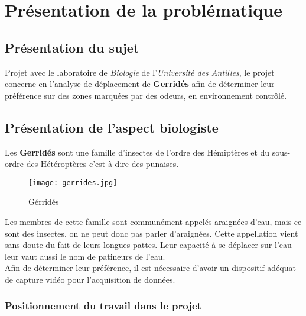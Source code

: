 \chapter{Présentation de la problématique}
    \section{Présentation du sujet}
    Projet avec le laboratoire de \textit{Biologie} de l'\textit{Université des Antilles}, le projet concerne en l'analyse de déplacement de \textbf{Gerridés} afin de déterminer leur préférence sur des zones marquées par des odeurs, en environnement contrôlé.


    \section{Présentation de l'aspect biologiste}
    Les \textbf{Gerridés} sont une famille d'insectes de l'ordre des Hémiptères et du sous-ordre des Hétéroptères c'est-à-dire des punaises.
    \begin{figure}[ht]
        \centering
        \texttt{[image: gerrides.jpg]}
        \caption{Gérridés}        
    \end{figure}

    \vspace{0.1cm}

    \begin{flushleft}
        Les membres de cette famille sont communément appelés araignées d’eau, mais ce sont des insectes, on ne peut donc pas parler d'araignées. Cette appellation vient sans doute du fait de leurs longues pattes. Leur capacité à se déplacer sur l'eau leur vaut aussi le nom de patineurs de l'eau.\\[0.1cm]

        Afin de déterminer leur préférence, il est nécessaire d'avoir un dispositif adéquat de capture vidéo pour l'acquisition de données.
    \end{flushleft}        

    \subsection{Positionnement du travail dans le projet}
    
